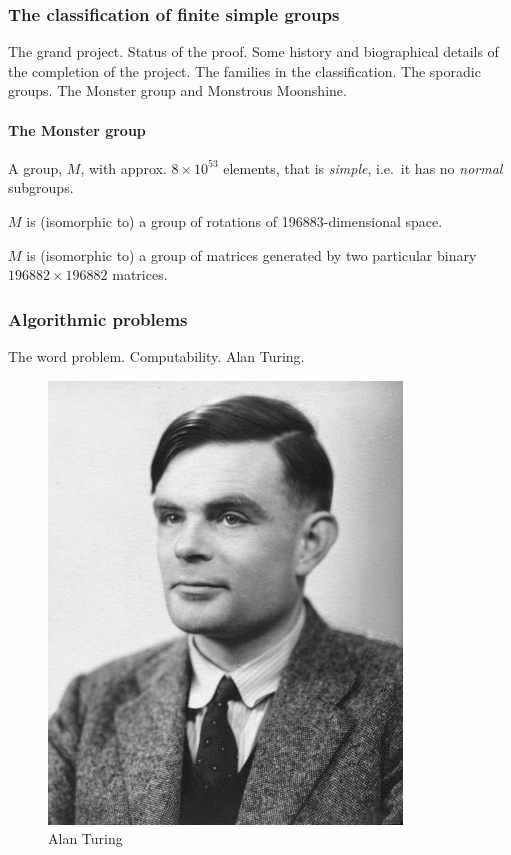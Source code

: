\subsubsection{The classification of finite simple
groups}\label{the-classification-of-finite-simple-groups}

The grand project. Status of the proof. Some history and biographical
details of the completion of the project. The families in the
classification. The sporadic groups. The Monster group and Monstrous
Moonshine.

\paragraph{The Monster group}\label{the-monster-group}

A group, $M$, with approx. $8 \times 10^{53}$ elements, that is
\emph{simple}, i.e.~it has no \emph{normal} subgroups.

$M$ is (isomorphic to) a group of rotations of 196883-dimensional space.

$M$ is (isomorphic to) a group of matrices generated by two particular
binary $196882 \times 196882$ matrices.

\subsubsection{Algorithmic problems}\label{algorithmic-problems}

The word problem. Computability. Alan Turing.

\begin{figure}[htbp]
\centering
\includegraphics{turing.jpg}
\caption{Alan Turing}
\end{figure}

